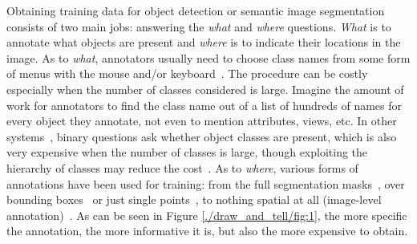 Obtaining training data for object detection or semantic image segmentation consists of two main
jobs: answering the \emph{what} and \emph{where} questions. \emph{What} is to annotate what
objects are present and \emph{where} is to indicate their locations in
the image.  As to \emph{what}, annotators usually need to choose class
names from some form of menus with the mouse and/or
keyboard~\citep{open:surface}. The procedure can be costly especially
when the number of classes considered is large. Imagine the amount of
work for annotators to find the class name out of a list of hundreds
of names for every object they annotate, not even to mention
attributes, views, etc. In other systems~\citep{whatpoint, coco:eccv},
binary questions ask whether object classes are present, which is also
very expensive when the number of classes is large, though exploiting
the hierarchy of classes may reduce the
cost~\citep{scalable:annotation, coco:eccv}. As to \emph{where},
various forms of annotations have been used for training: from the
full segmentation masks~\citep{rcnn, rcnn_crf, crfasrnn}, over
bounding boxes~\citep{weak:seg:xu, BoxSup, ConsCNN} or just single
points~\citep{whatpoint}, to nothing spatial at all (image-level
annotation)~\citep{markov:topic, cnn:em}.  As can be seen in Figure \ref{./draw_and_tell/fig:1}, the more
specific the annotation, the more informative it is, but also the more
expensive to obtain. %

